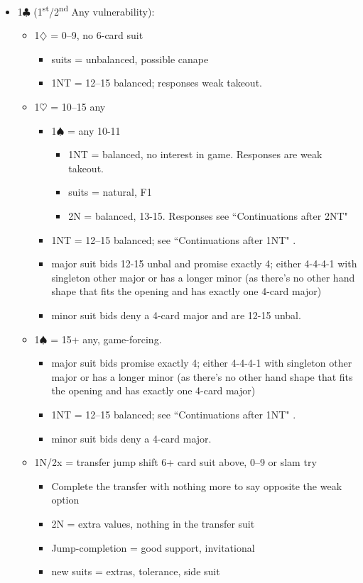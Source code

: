 \documentclass[a4paper,14pt]{extarticle}
\begin{document}
\begin{itemize}
\item 1$\clubsuit$ (1\textsuperscript{st}/2\textsuperscript{nd} Any vulnerability):
	\begin{itemize}
   \item 1$\diamondsuit$ = 0--9, no 6-card suit
		\begin{itemize}
      \item suits = unbalanced, possible canape
      \item 1NT = 12--15 balanced; responses weak takeout.
		\end{itemize}
   \item 1$\heartsuit$ = 10--15 any
		\begin{itemize}
      \item 1$\spadesuit$ = any 10-11
			\begin{itemize}
			\item 1NT = balanced, no interest in game. Responses are weak takeout.
			\item suits = natural, F1
			\item 2N = balanced, 13-15. Responses see ``Continuations after 2NT" 
			\end{itemize}
      \item 1NT = 12--15 balanced; see ``Continuations after 1NT" .
      \item major suit bids 12-15 unbal and promise exactly 4; either 4-4-4-1
            with singleton other major or has a longer minor (as there's no other
            hand shape that fits the opening and has exactly one 4-card major)
      \item minor suit bids deny a 4-card major and are 12-15 unbal.
		\end{itemize}
   \item 1$\spadesuit$ = 15+ any, game-forcing.
		\begin{itemize}
      \item major suit bids promise exactly 4; either 4-4-4-1 with singleton other
         major or has a longer minor (as there's no other hand shape that fits the
         opening and has exactly one 4-card major)
      \item 1NT = 12--15 balanced; see ``Continuations after 1NT" .
      \item minor suit bids deny a 4-card major.
		\end{itemize}
   \item 1N/2x = transfer jump shift 6+ card suit above, 0--9 or slam try
		\begin{itemize}
		\item Complete the transfer with nothing more to say opposite the weak option
		\item 2N = extra values, nothing in the transfer suit
		\item Jump-completion = good support, invitational
		\item new suits = extras, tolerance, side suit
		\end{itemize}
	\end{itemize}


\end{itemize}
\end{document}
